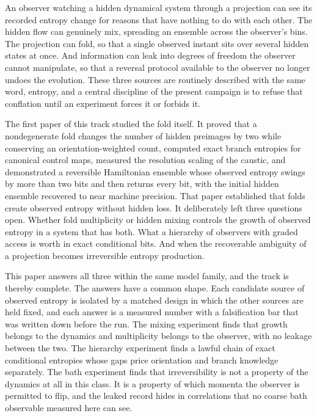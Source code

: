 \documentclass[aps,pre,reprint,nofootinbib]{revtex4-2}
\begin{document}
An observer watching a hidden dynamical system through a projection can see
its recorded entropy change for reasons that have nothing to do with each
other.  The hidden flow can genuinely mix, spreading an ensemble across the
observer's bins.  The projection can fold, so that a single observed
instant sits over several hidden states at once.  And information can leak
into degrees of freedom the observer cannot manipulate, so that a reversal
protocol available to the observer no longer undoes the evolution.  These
three sources are routinely described with the same word, entropy, and a
central discipline of the present campaign is to refuse that conflation
until an experiment forces it or forbids it.

The first paper of this track \cite{EntropyPaper} studied the fold itself.
It proved that a nondegenerate fold changes the number of hidden preimages
by two while conserving an orientation-weighted count, computed exact
branch entropies for canonical control maps, measured the resolution
scaling of the caustic, and demonstrated a reversible Hamiltonian ensemble
whose observed entropy swings by more than two bits and then returns every
bit, with the initial hidden ensemble recovered to near machine precision.
That paper established that folds create observed entropy without hidden
loss.  It deliberately left three questions open.  Whether fold
multiplicity or hidden mixing controls the growth of observed entropy in a
system that has both.  What a hierarchy of observers with graded access is
worth in exact conditional bits.  And when the recoverable ambiguity of a
projection becomes irreversible entropy production.

This paper answers all three within the same model family, and the track
is thereby complete.  The answers have a common shape.  Each candidate
source of observed entropy is isolated by a matched design in which the
other sources are held fixed, and each answer is a measured number with a
falsification bar that was written down before the run.  The mixing
experiment finds that growth belongs to the dynamics and multiplicity
belongs to the observer, with no leakage between the two.  The hierarchy
experiment finds a lawful chain of exact conditional entropies whose gaps
price orientation and branch knowledge separately.  The bath experiment
finds that irreversibility is not a property of the dynamics at all in
this class.  It is a property of which momenta the observer is permitted
to flip, and the leaked record hides in correlations that no coarse bath
observable measured here can see.
\end{document}
